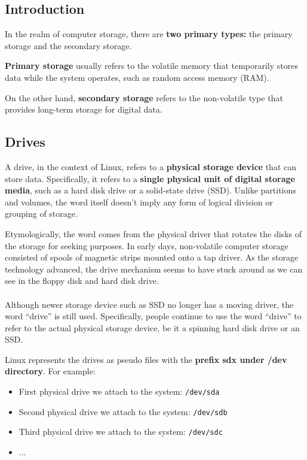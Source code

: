 \documentclass{article}
\newenvironment{blocktemplateI}[1]{%
    \tcolorbox[beamer,%
    noparskip,breakable,
    colframe=Violet,%
    colbacklower=Black,%
    title=#1]}%
    {\endtcolorbox}
\begin{document}
\subsection{Introduction}

In the realm of computer storage, there are \textbf{two primary types:} the primary storage and the secondary storage.

\textbf{Primary storage} usually refers to the volatile memory that temporarily stores data while the system operates, such as random access memory (RAM).

On the other hand, \textbf{secondary storage} refers to the non-volatile type that provides long-term storage for digital data.

\subsection{Drives}
A drive, in the context of Linux, refers to a \textbf{physical storage device} that can store data. Specifically, it refers to a \textbf{single physical unit of digital storage media}, such as a hard disk drive or a solid-state drive (SSD). Unlike partitions and volumes, the word itself doesn't imply any form of logical division or grouping of storage.

\begin{blocktemplateI}{Note}
Etymologically, the word comes from the physical driver that rotates the disks of the storage for seeking purposes. In early days, non-volatile computer storage consisted of spools of magnetic strips mounted onto a tap driver. As the storage technology advanced, the drive mechanism seems to have stuck around as we can see in the floppy disk and hard disk drive.
\\\\
Although newer storage device such as SSD no longer has a moving driver, the word “drive” is still used. Specifically, people continue to use the word “drive” to refer to the actual physical storage device, be it a spinning hard disk drive or an SSD.
\end{blocktemplateI}


Linux represents the drives as pseudo files with the \textbf{prefix sdx under /dev directory}. For example:

\begin{itemize}
    \item First physical drive we attach to the system: \verb|/dev/sda|
    \item Second physical drive we attach to the system: \verb|/dev/sdb|
    \item Third physical drive we attach to the system: \verb|/dev/sdc|
    \item ...
\end{itemize}
\end{document}
